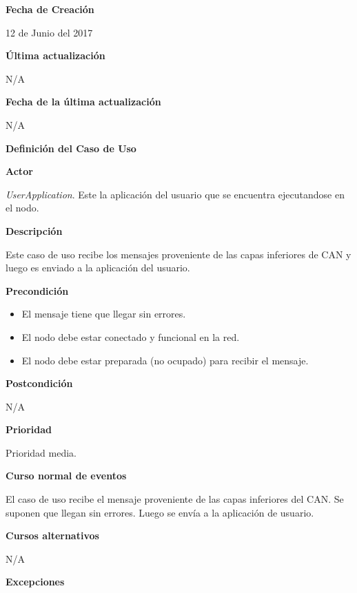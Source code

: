 \large\textbf{Fecha de Creación}
\vspace{3mm}

12 de Junio del 2017

\large\textbf{Última actualización}
\vspace{3mm}

N/A

\large\textbf{Fecha de la última actualización}
\vspace{3mm}

N/A

\Large\textbf{Definición del Caso de Uso}
\vspace{3mm}

\large\textbf{Actor}
\vspace{3mm}

\textit{UserApplication}. Este la aplicación del usuario que se encuentra ejecutandose en el nodo.

\large\textbf{Descripción}
\vspace{3mm}

Este caso de uso recibe los mensajes proveniente de las capas inferiores de CAN
y luego es enviado a la aplicación del usuario.

\large\textbf{Precondición}
\begin{itemize}
\item El mensaje tiene que llegar sin errores.
\item El nodo debe estar conectado y funcional en la red.
\item El nodo debe estar preparada (no ocupado) para recibir el mensaje.
\end{itemize}

\large\textbf{Postcondición}
\vspace{5mm}

N/A

\large\textbf{Prioridad}
\vspace{3mm}

Prioridad media.

\large\textbf{Curso normal de eventos}
\vspace{3mm}

El caso de uso recibe el mensaje proveniente de las capas inferiores del CAN.
Se suponen que llegan sin errores. Luego se envía a la aplicación de usuario.

\large\textbf{Cursos alternativos}
\vspace{3mm}

N/A

\large\textbf{Excepciones}
\vspace{3mm}

